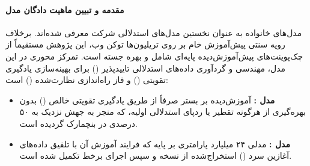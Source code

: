 \item {}

\paragraph*{مقدمه و تبیین ماهیت دادگان مدل}
مدل‌های خانواده  به عنوان نخستین مدل‌های استدلالی شرکت  \cite{mistral2025magistral} معرفی شده‌اند. برخلاف رویه سنتی پیش‌آموزش خام بر روی تریلیون‌ها توکن وب، این پژوهش مستقیماً از چک‌پوینت‌های پیش‌آموزش‌دیده پایه‌ای شامل  و  بهره جسته است. تمرکز محوری در این مدل، مهندسی و گردآوری داده‌های استدلالی تاییدپذیر () برای بهینه‌سازی یادگیری تقویتی () و فاز راه‌اندازی نظارت‌شده () است:
\begin{itemize}
    \item \textbf{مدل :} آموزش‌دیده بر بستر  صرفاً از طریق یادگیری تقویتی خالص () بدون بهره‌گیری از هرگونه تقطیر یا ردپای استدلالی اولیه، که منجر به جهش نزدیک به ۵۰ درصدی در بنچمارک  گردیده است.
    \item \textbf{مدل :} مدلی ۲۴ میلیارد پارامتری بر پایه  که فرایند آموزش آن با تلفیق داده‌های آغازین سرد () استخراج‌شده از نسخه  و سپس اجرای برخط  تکمیل شده است.
\end{itemize}

